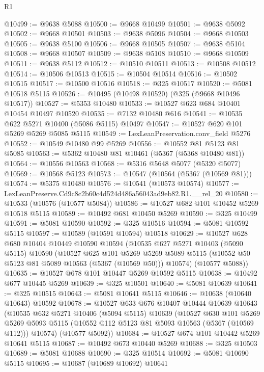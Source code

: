 \begin{lexlean}{R1}
\begin{coremodule}
@10499 := @9638 @5088
@10500 := @9668 @10499
@10501 := @9638 @5092
@10502 := @9668 @10501
@10503 := @9638 @5096
@10504 := @9668 @10503
@10505 := @9638 @5100
@10506 := @9668 @10505
@10507 := @9638 @5104
@10508 := @9668 @10507
@10509 := @9638 @5108
@10510 := @9668 @10509
@10511 := @9638 @5112
@10512 := @10510 @10511
@10513 := @10508 @10512
@10514 := @10506 @10513
@10515 := @10504 @10514
@10516 := @10502 @10515
@10517 := @10500 @10516
@10518 := @325 @10517
@10520 := @5081 @10518 @5115
@10526 := @10495 (@10498 @10520) (@325 (@9668 @10496 @10517))
@10527 := @5353 @10480
@10533 := @10527 @623 @684 @10401 @10454 @10497 @10520
@10535 := @7132 @10480 @616
@10541 := @10535 @622 @5271 @10400 (@5086 @5115) @10497
@10547 := @10527 @620 @101 @5269 @5269 @5085 @5115
@10549 := LexLeanPreservation.conv_field @5276
@10552 := @10549 @10480 @99 @5269
@10556 := @10552 @81 @5123 @81 @5085
@10563 := @5362 @10480 @81 @10461 (@5367 (@5368 @10480 @81))
@10564 := @10556 @10563
@10568 := @5316 @5648 @5077 (@5320 @5077)
@10569 := @10568 @5123
@10573 := @10547 (@10564 (@5367 (@10569 @81)))
@10574 := @5375 @10480
@10576 := @10541 (@10573 @10574)
@10577 := LexLeanPreserve.Cd9c8c2b60c4d524d486a56043ad9eb82.R1.__rel_20
@10580 := @10533 (@10576 (@10577 @5084))
@10586 := @10527 @682 @101 @10452 @5269 @10518 @5115
@10589 := @10492 @681 @10450 @5269
@10590 := @325 @10499
@10591 := @5081 @10590
@10592 := @325 @10516
@10594 := @5081 @10592 @5115
@10597 := @10589 (@10591 @10594) @10518
@10629 := @10527
    @628
    @680
    @10404
    @10449
    @10590
    @10594
    (@10535
      @627
      @5271
      @10403
      (@5090 @5115)
      @10590
      (@10527
        @625
        @101
        @5269
        @5269
        @5089
        @5115
        (@10552 @50 @5123 @81 @5089 @10563 (@5367 (@10569 @50)))
        @10574)
      (@10577 @5088))
@10635 := @10527 @678 @101 @10447 @5269 @10592 @5115
@10638 := @10492 @677 @10445 @5269
@10639 := @325 @10501
@10640 := @5081 @10639
@10641 := @325 @10515
@10643 := @5081 @10641 @5115
@10646 := @10638 (@10640 @10643) @10592
@10678 := @10527
    @633
    @676
    @10407
    @10444
    @10639
    @10643
    (@10535
      @632
      @5271
      @10406
      (@5094 @5115)
      @10639
      (@10527
        @630
        @101
        @5269
        @5269
        @5093
        @5115
        (@10552 @112 @5123 @81 @5093 @10563 (@5367 (@10569 @112)))
        @10574)
      (@10577 @5092))
@10684 := @10527 @674 @101 @10442 @5269 @10641 @5115
@10687 := @10492 @673 @10440 @5269
@10688 := @325 @10503
@10689 := @5081 @10688
@10690 := @325 @10514
@10692 := @5081 @10690 @5115
@10695 := @10687 (@10689 @10692) @10641

\end{coremodule}
\end{lexlean}

